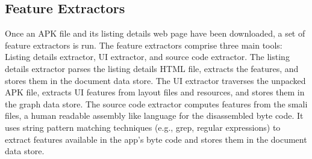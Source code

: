 \subsection{Feature Extractors}
Once an APK file and its listing details web page have been downloaded, a set of feature extractors is run.
The feature extractors comprise three main tools: Listing details extractor, UI extractor, and source code extractor.
The listing details extractor parses the listing details HTML file, extracts the features, and stores them in the document data store.
The UI extractor traverses the unpacked APK file, extracts UI features from layout files and resources, and stores them in the graph data store.
The source code extractor computes features from the smali files, a human readable assembly like language for the disassembled byte code.
It uses string pattern matching techniques (e.g., grep, regular expressions) to extract features available in the app's byte code and stores them in the document data store.

